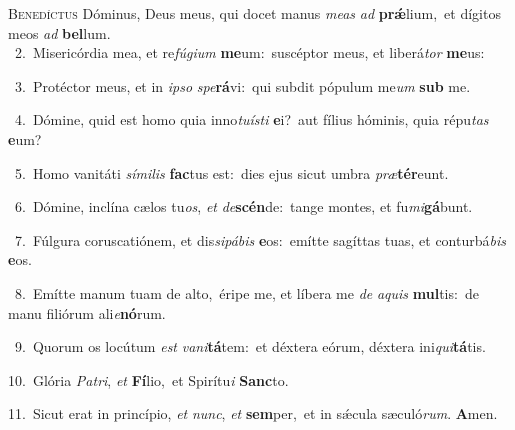 \lettrine{\initial\textcolor{\initialcolor}{B}}{enedíctus} Dóminus, Deus meus, qui docet manus \textit{me}\-\textit{as} \textit{ad} \textbf{prǽ}\-lium,~\star et dígitos meos \textit{ad} \textbf{bel}\-lum.\\
{\numbfont\textcolor{\numbcolor}{~2.}}~Misericórdia mea, et re\-\textit{fú}\-\textit{gi}\textit{um} \textbf{me}\-um:~\star suscéptor meus, et liberá\textit{tor} \textbf{me}\-us:\par
{\numbfont\textcolor{\numbcolor}{~3.}}~Protéctor meus, et in \textit{ip}\-\textit{so} \textit{spe}\-\textbf{rá}vi:~\star qui subdit pópulum me\textit{um} \textbf{sub} me.\par
{\numbfont\textcolor{\numbcolor}{~4.}}~Dómine, quid est homo quia inno\-\textit{tu}\-\textit{ís}\textit{ti} \textbf{e}\-i?~\star aut fílius hóminis, quia répu\textit{tas} \textbf{e}\-um?\par
{\numbfont\textcolor{\numbcolor}{~5.}}~Homo vanitáti \textit{sí}\-\textit{mi}\textit{lis} \textbf{fac}\-tus est:~\star dies ejus sicut umbra \textit{præ}\-\textbf{tér}eunt.\par
{\numbfont\textcolor{\numbcolor}{~6.}}~Dómine, inclína cælos tu\-\textit{os}\-, \textit{et} \textit{de}\-\textbf{scén}de:~\star tange montes, et fu\-\textit{mi}\-\textbf{gá}bunt.\par
{\numbfont\textcolor{\numbcolor}{~7.}}~Fúlgura coruscatiónem, et dis\-\textit{si}\-\textit{pá}\textit{bis} \textbf{e}\-os:~\star emítte sagíttas tuas, et conturbá\textit{bis} \textbf{e}\-os.\par
{\numbfont\textcolor{\numbcolor}{~8.}}~Emítte manum tuam de alto,~\dagger éripe me, et líbera me \textit{de} \textit{a}\-\textit{quis} \textbf{mul}\-tis:~\star de manu filiórum ali\-\textit{e}\-\textbf{nó}rum.\par
{\numbfont\textcolor{\numbcolor}{~9.}}~Quorum os locútum \textit{est} \textit{va}\-\textit{ni}\textbf{tá}tem:~\star et déxtera eórum, déxtera ini\-\textit{qui}\-\textbf{tá}tis.\par
{\numbfont\textcolor{\numbcolor}{10.}}~Glória \textit{Pa}\-\textit{tri}, \textit{et} \textbf{Fí}\-lio,~\star et Spirítu\textit{i} \textbf{Sanc}\-to.\par
{\numbfont\textcolor{\numbcolor}{11.}}~Sicut erat in princípio, \textit{et} \textit{nunc}\-, \textit{et} \textbf{sem}\-per,~\star et in sǽcula sæculó\-\textit{rum}\-. \textbf{A}\-men.\par
